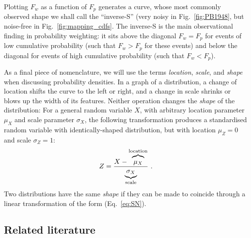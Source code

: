 \documentclass[a4paper, 12pt]{article}
\newcommand{\elabel}[1]{\label{eq:#1}}
\newcommand{\eref}[1]{(Eq.~\ref{eq:#1})}
\newcommand{\fref}[1]{Fig.~\ref{fig:#1}}
\newcommand{\be}{\begin{equation}}
\newcommand{\ee}{\end{equation}}
\newcommand{\ND}{\mathcal{N}} %
\begin{document}
Plotting $F_w$ as a function of $F_p$ generates a curve, whose most commonly observed shape we shall call the ``inverse-S'' (very noisy in \fref{PB1948}, but noise-free in \fref{mapping_cdfs}. The inverse-S is the main observational finding in probability weighting: it sits above the diagonal $F_w=F_p$ for events of low cumulative probability (such that $F_w>F_p$ for these events) and below the diagonal for events of high cumulative probability (such that $F_w<F_p$).

As a final piece of nomenclature, we will use the terms \textit{location}, \textit{scale}, and \textit{shape} when discussing probability densities. 
In a graph of a distribution, a change of location shifts the curve to the left or right, and a change in scale shrinks or blows up the width of its features. Neither operation changes the \textit{shape} of the distribution:
For a general random variable $X$, with arbitrary location parameter $\mu_X$ and scale parameter $\sigma_X$, the following transformation produces a standardised random variable with identically-shaped distribution, but with location $\mu_Z=0$ and scale $\sigma_Z=1$:
%
\be
Z = \frac{X-\overbrace{\mu_X \mathstrut}^{\text{location}}}{\underbrace{\sigma_X\mathstrut}_{\text{scale}}}~.
\elabel{SN}
\ee
%
Two distributions have the same \textit{shape} if they can be made to coincide through a linear transformation of the form \eref{SN}.

\subsection{Related literature}
\end{document}
